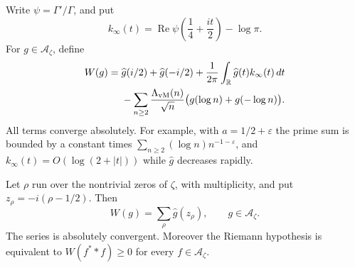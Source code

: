 Write $\psi=\Gamma'/\Gamma$, and put
\[
 k_\infty(t)=\operatorname{Re}\psi\left(\frac14+\frac{it}{2}\right)-\log\pi.
\]
For $g\in\mathcal A_\zeta$, define
\begin{align}
 W(g)={}&\widehat g(i/2)+\widehat g(-i/2)
 +\frac1{2\pi}\int_{\mathbb R}\widehat g(t)k_\infty(t)\,dt \notag\\
 &-\sum_{n\geq2}\frac{\Lambda_{\mathrm{vM}}(n)}{\sqrt n}
                    \bigl(g(\log n)+g(-\log n)\bigr).
 \label{syn-arith:weil-formula}
\end{align}
All terms converge absolutely.  For example, with $a=1/2+\varepsilon$ the
prime sum is bounded by a constant times
$\sum_{n\geq2}(\log n)n^{-1-\varepsilon}$, and
$k_\infty(t)=O(\log(2+|t|))$ while $\widehat g$ decreases rapidly.

\begin{theorem}
\label{syn-arith:weil-theorem}
Let $\rho$ run over the nontrivial zeros of $\zeta$, with multiplicity, and
put $z_\rho=-i(\rho-1/2)$.  Then
\[
 W(g)=\sum_\rho\widehat g(z_\rho),\qquad g\in\mathcal A_\zeta.
\]
The series is absolutely convergent.  Moreover the Riemann hypothesis is
equivalent to $W(f^**f)\geq0$ for every $f\in\mathcal A_\zeta$.
\end{theorem}
